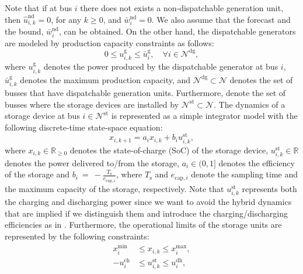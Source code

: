 Note that if at bus $i$ there does not exists a non-dispatchable generation unit, then $\hat{u}_{i,k}^{\mathrm{nd}}=0$, for any $k\geq0$, and $\bar{w}_{i}^{\mathrm{nd}}=0$. We also assume that the forecast and the bound, $\bar{w}_{i}^{\mathrm{nd}}$, can be obtained. On the other hand, the dispatchable generators are modeled by production capacity constraints as follows:
\begin{equation}
0 \leq {u}_{i,k}^{\mathrm{g}} \leq \bar{u}_{i}^{\mathrm{g}},  \quad \forall i \in \mathcal{N}^{\mathrm{dg}}, \label{eq:p_g}
\end{equation}
where ${u}_{i,k}^{\mathrm{g}}$ denotes the power produced by the dispatchable generator at bus $i$, $\bar{u}_{i,k}^{\mathrm{g}}$ denotes the maximum production capacity, and $\mathcal{N}^{\mathrm{dg}} \subset \mathcal{N}$ denotes the set of busses that have dispatchable generation units. 
Furthermore, denote the set of busses where the storage devices are installed by $\mathcal{N}^{\mathrm{st}} \subset \mathcal{N}$. The dynamics of a storage device at bus $i \in \mathcal{N}^{\mathrm{st}}$ is represented as a simple integrator model with the following discrete-time state-space equation:
\begin{equation}
x_{i,k+1} = a_i x_{i,k} + b_i u^{\mathrm{st}}_{i,k}, \label{eq:dyn_bat}
\end{equation}
where $x_{i,k} \in \mathbb{R}_{\geq 0}$ denotes the state-of-charge (SoC) of the storage device, $u^{\mathrm{st}}_{i,k} \in \mathbb{R}$ denotes the power delivered to/from the storage, $a_i \in (0,1]$ denotes the efficiency of the storage and $b_i~=~-\frac{T_{\mathrm{s}}}{e_{\mathrm{cap},i}}$, where $T_{\mathrm{s}}$ and $e_{\mathrm{cap},i}$ denote the sampling time and the maximum capacity of the storage, respectively. Note that $u^{\mathrm{st}}_{i,k}$ represents both the charging and discharging power since we want to avoid the hybrid dynamics that are implied if we distinguish them and introduce the charging/discharging efficiencies as in \cite{garcia2015,garcia2016}. Furthermore, the operational limits of the storage units are represented by the following constraints:
\begin{align}
x^{\mathrm{min}}_i &\leq x_{i,k} \leq x^{\mathrm{max}}_i,  \label{eq:cap_bat}\\
-u^{\mathrm{ch}}_i &\leq u^{\mathrm{st}}_{i,k} \leq u^{\mathrm{dh}}_i,\label{eq:ch_bat}
\end{align}
